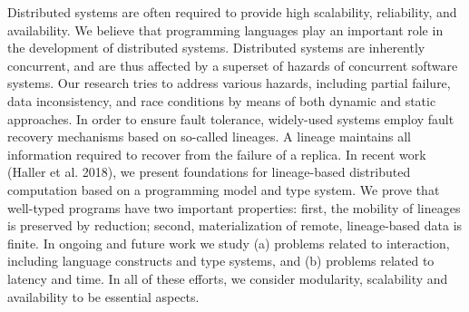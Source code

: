 Distributed systems are often required to provide high scalability, reliability, and availability. We believe that programming languages play an important role in the development of distributed systems. Distributed systems are inherently concurrent, and are thus affected by a superset of hazards of concurrent software systems. Our research tries to address various hazards, including partial failure, data inconsistency, and race conditions by means of both dynamic and static approaches. In order to ensure fault tolerance, widely-used systems employ fault recovery mechanisms based on so-called lineages. A lineage maintains all information required to recover from the failure of a replica. In recent work (Haller et al. 2018), we present foundations for lineage-based distributed computation based on a programming model and type system. We prove that well-typed programs have two important properties: first, the mobility of lineages is preserved by reduction; second, materialization of remote, lineage-based data is finite. In ongoing and future work we study (a) problems related to interaction, including language constructs and type systems, and (b) problems related to latency and time. In all of these efforts, we consider modularity, scalability and availability to be essential aspects.